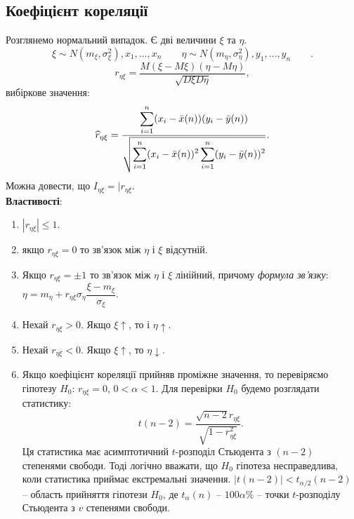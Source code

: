 \subsection{Коефіцієнт кореляції}
Розглянемо нормальний випадок. Є дві величини $\xi$ та $\eta$. \[\xi \sim N(m_\xi, \sigma_\xi^2), x_1, \ldots, x_n \qquad \eta \sim N(m_\eta, \sigma_\eta^2), y_1, \ldots, y_n \qquad. \]
\[ r_{\eta\xi} = \dfrac{M(\xi-M\xi)(\eta-M\eta)}{\sqrt{D\xi D\eta}}, \] вибіркове значення:
\[ \widehat{r}_{\eta\xi} = \dfrac{\displaystyle\sum\limits_{i=1}^n(x_i-\bar{x}(n))(y_i-\bar{y}(n))}{\sqrt{\displaystyle\sum\limits_{i=1}^n(x_i-\bar{x}(n))^2\displaystyle\sum\limits_{i=1}^n(y_i-\bar{y}(n))^2}}. \]
Можна довести, що $I_{\eta\xi}=|r_{\eta\xi}$. \\

\textbf{Властивості}:
\begin{enumerate}
	\item $|r_{\eta\xi}| \le 1$.
	\item якщо $r_{\eta\xi} = 0$ то зв'язок між $\eta$ і $\xi$ відсутній.
	\item Якщо $r_{\eta\xi} = \pm 1$ то зв'язок між $\eta$ і $\xi$ лінійний, причому \textit{формула зв'язку}: $\eta = m_\eta + r_{\eta\xi}\sigma_\eta \dfrac{\xi - m_\xi}{\sigma_\xi}$.
	\item Нехай $r_{\eta\xi} > 0$. Якщо $\xi \uparrow$, то і $\eta \uparrow$.
	\item Нехай $r_{\eta\xi} < 0$. Якщо $\xi \uparrow$, то $\eta \downarrow$.
	\item Якщо коефіцієнт кореляції прийняв проміжне значення, то перевіряємо гіпотезу $H_0$: $r_{\eta\xi} = 0$, $0 < \alpha < 1$. Для перевірки $H_0$ будемо розглядати статистику: \[t(n-2)=\dfrac{\sqrt{n-2}r_{\eta\xi}}{\sqrt{1-r_{\eta\xi}^2}}. \]
	Ця статистика має асимптотичний $t$-розподіл Стьюдента з $(n - 2)$ степенями свободи. Тоді логічно вважати, що $H_0$ гіпотеза несправедлива, коли статистика приймає екстремальні значення. $|t(n-2)| < t_{\alpha/2}(n-2)$ -- область прийняття гіпотези $H_0$, де $t_\alpha(n)$ -- $100\alpha\%$ -- точки $t$-розподілу Стьюдента з $v$ степенями свободи.
\end{enumerate}
